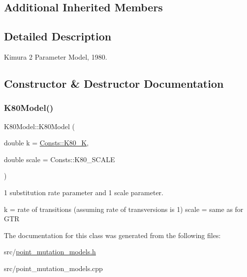 \subsection*{Additional Inherited Members}


\subsection{Detailed Description}
Kimura 2 Parameter Model, 1980. 

\subsection{Constructor \& Destructor Documentation}
\mbox{\label{classretrocombinator_1_1K80Model_af199581e9a4d387f5e9e4f5bd048904b}} 
\subsubsection{\texorpdfstring{K80\+Model()}{K80Model()}}
{\footnotesize\ttfamily K80\+Model\+::\+K80\+Model (\begin{DoxyParamCaption}\item[{double}]{k = {\ttfamily \hyperlink{namespaceretrocombinator_1_1Consts_ac72fd4ec7b9dc3b42523a83cd69eaee2}{Consts\+::\+K80\+\_\+K}},  }\item[{double}]{scale = {\ttfamily Consts\+:\+:K80\+\_\+SCALE} }\end{DoxyParamCaption})}



1 substitution rate parameter and 1 scale parameter. 

k = rate of transitions (assuming rate of transversions is 1) scale = same as for G\+TR 

The documentation for this class was generated from the following files\+:\begin{DoxyCompactItemize}
\item 
src/\hyperlink{point__mutation__models_8h}{point\+\_\+mutation\+\_\+models.\+h}\item 
src/point\+\_\+mutation\+\_\+models.\+cpp\end{DoxyCompactItemize}
